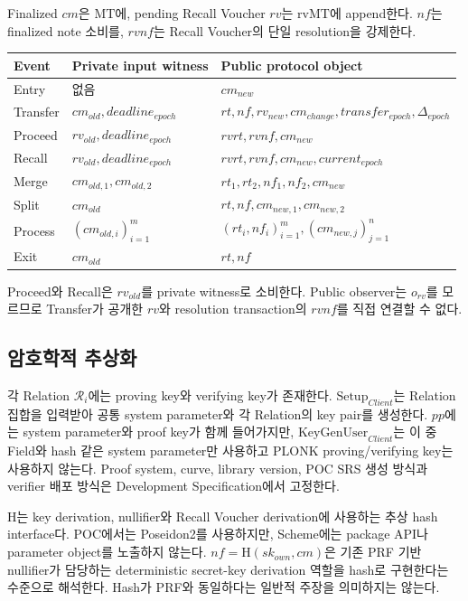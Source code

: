 \documentclass[11pt,a4paper]{extarticle}
\newcommand{\Hash}{\mathrm{H}}
\newcommand{\MT}{\mathrm{MT}}
\newcommand{\rvMT}{\mathrm{rvMT}}
\begin{document}
Finalized $cm$은 $\MT$에, pending Recall Voucher $rv$는 $\rvMT$에 append한다.
$nf$는 finalized note 소비를, $rvnf$는 Recall Voucher의 단일 resolution을 강제한다.

\begin{center}
\begin{tabular}{lll}
\hline
Event & Private input witness & Public protocol object \\
\hline
Entry & 없음 & $cm_{new}$ \\
Transfer & $cm_{old},deadline_{epoch}$ &
$rt,nf,rv_{new},cm_{change},transfer_{epoch},\Delta_{epoch}$ \\
Proceed & $rv_{old},deadline_{epoch}$ & $rvrt,rvnf,cm_{new}$ \\
Recall & $rv_{old},deadline_{epoch}$ &
$rvrt,rvnf,cm_{new},current_{epoch}$ \\
Merge & $cm_{old,1},cm_{old,2}$ & $rt_1,rt_2,nf_1,nf_2,cm_{new}$ \\
Split & $cm_{old}$ & $rt,nf,cm_{new,1},cm_{new,2}$ \\
Process & $(cm_{old,i})_{i=1}^{m}$ &
$(rt_i,nf_i)_{i=1}^{m},(cm_{new,j})_{j=1}^{n}$ \\
Exit & $cm_{old}$ & $rt,nf$ \\
\hline
\end{tabular}
\end{center}

Proceed와 Recall은 $rv_{old}$를 private witness로 소비한다. Public observer는
$o_{rv}$를 모르므로 Transfer가 공개한 $rv$와 resolution transaction의 $rvnf$를
직접 연결할 수 없다.

\subsection{암호학적 추상화}

각 Relation $\mathcal{R}_i$에는 proving key와 verifying key가 존재한다.
$\mathrm{Setup}_{Client}$는 Relation 집합을 입력받아 공통 system parameter와 각
Relation의 key pair를 생성한다. $pp$에는 system parameter와 proof key가 함께 들어가지만,
$\mathrm{KeyGenUser}_{Client}$는 이 중 Field와 hash 같은 system parameter만 사용하고
PLONK proving/verifying key는 사용하지 않는다. Proof system, curve, library version,
POC SRS 생성 방식과 verifier 배포 방식은 Development Specification에서 고정한다.

$\Hash$는 key derivation, nullifier와 Recall Voucher derivation에 사용하는
추상 hash interface다. POC에서는 Poseidon2를 사용하지만, Scheme에는 package API나
parameter object를 노출하지 않는다. $nf=\Hash(sk_{own},cm)$은 기존
PRF 기반 nullifier가 담당하는 deterministic secret-key derivation 역할을 hash로
구현한다는 수준으로 해석한다. Hash가 PRF와 동일하다는 일반적 주장을 의미하지는 않는다.
\end{document}
